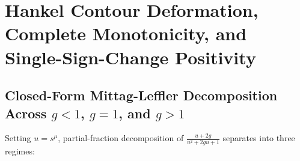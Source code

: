 \documentclass[onecolumn,10pt,notitlepage,amsmath,amssymb,floatfix]{revtex4-2}
\theoremstyle{plain}
\theoremstyle{definition}
\begin{document}
\section{Hankel Contour Deformation, Complete Monotonicity, and Single-Sign-Change Positivity}
\label{sec:S2}

\subsection{Closed-Form Mittag-Leffler Decomposition Across \texorpdfstring{$g < 1$, $g = 1$, and $g > 1$}{g < 1, g = 1, and g > 1}}

Setting $u = s^\mu$, partial-fraction decomposition of $\frac{u+2g}{u^2+2gu+1}$ separates into three regimes:
\end{document}
